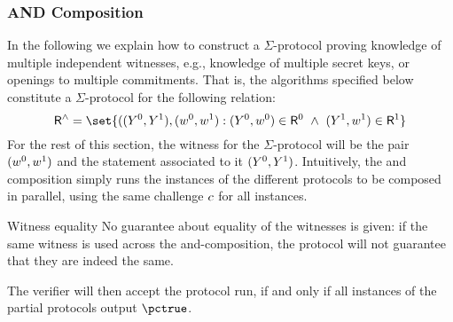 \documentclass[11pt]{article}
\begin{document}
  \subsubsection{AND Composition}
  In the following we explain how to construct a $\Sigma$-protocol proving knowledge of multiple independent witnesses, e.g., knowledge of multiple secret keys, or openings to multiple commitments.
  That is, the algorithms specified below constitute a $\Sigma$-protocol for the following relation:
\[
  \relation^\land = \set{
    ((\statement^0,\statement^1),(\witness^0,\witness^1) : (\statement^0,\witness^0)\in \relation^0 ~\land~ (\statement^1,\witness^1)\in\relation^1}
\]
For the rest of this section, the witness for the $\Sigma$-protocol
will be the pair $(w^0, w^1)$ and the statement associated to it
$(Y^0, Y^1)$.
  Intuitively, the and composition simply runs the instances of the different protocols to be composed in parallel, using the same challenge $c$ for all instances.
  \begin{remark}{Witness equality}{}
  No guarantee about equality of the witnesses is given: if the same witness is used across the and-composition, the protocol will not guarantee that they are indeed the same.
  \end{remark}
	The verifier will then accept the protocol run, if and only if all instances of the partial protocols output $\accept$.

\end{document}
